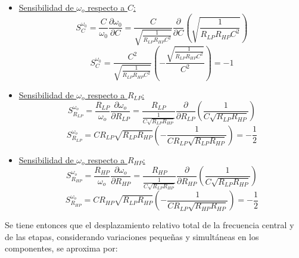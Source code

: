 \documentclass[12pt,a4paper]{article}
\begin{document}
\begin{itemize}
    \item \underline{Sensibilidad de $\omega_o$ respecto a $C$:}
    \begin{equation}
        \label{eq_64}
        S_{C}^{\omega_{0}} = \frac{C}{\omega_{0}}\frac{\partial \omega_{0}}{\partial C} = \frac{C}{\sqrt{\frac{1}{R_{LP}R_{HP}C^2}}}\frac{\partial}{\partial C}\left(\sqrt{\frac{1}{R_{LP}R_{HP}C^2}}\right)
    \end{equation}
    \begin{equation}
        \label{eq_65}
        S_{C}^{\omega_{0}} = \frac{C^{2}}{\sqrt{\frac{1}{R_{LP}R_{HP}C^2}}} \left(-\frac{\sqrt{\frac{1}{R_{LP}R_{HP}C^2}}}{C^2}\right) = - 1
    \end{equation}
    \item \underline{Sensibilidad de $\omega_o$ respecto a $R_{LP}$:}
    \begin{equation}
        \label{eq_66}
            S_{R_{LP}}^{\omega_o} = \frac{R_{LP}}{\omega_{o}} \frac{\partial \omega_{o}}{\partial R_{LP}} = \frac{R_{LP}}{\frac{1}{C\sqrt{R_{LP}R_{HP}}}} \frac{\partial}{\partial R_{LP}} \left(\frac{1}{C\sqrt{R_{LP}R_{HP}}}\right) 
        \end{equation}
        \begin{equation}
            \label{eq_67}
            S_{R_{LP}}^{\omega_o} =  CR_{LP}\sqrt{R_{LP}R_{HP}} \left(-\frac{1}{CR_{LP}\sqrt{R_{LP}R_{HP}}}\right) = - \frac{1}{2} 
        \end{equation}
    \item \underline{Sensibilidad de $\omega_o$ respecto a $R_{HP}$:}
    \begin{equation}
        \label{eq_68}
            S_{R_{HP}}^{\omega_o} = \frac{R_{HP}}{\omega_{o}} \frac{\partial \omega_{o}}{\partial R_{HP}} = \frac{R_{HP}}{\frac{1}{C\sqrt{R_{LP}R_{HP}}}} \frac{\partial}{\partial R_{HP}} \left(\frac{1}{C\sqrt{R_{LP}R_{HP}}}\right) 
        \end{equation}
        \begin{equation}
            \label{eq_69}
            S_{R_{HP}}^{\omega_o} =  CR_{HP}\sqrt{R_{LP}R_{HP}} \left(-\frac{1}{CR_{LP}\sqrt{R_{HP}R_{HP}}}\right) = - \frac{1}{2} 
        \end{equation}
\end{itemize}

Se tiene entonces que el desplazamiento relativo total de la frecuencia central y de las etapas, considerando variaciones pequeñas y simultáneas en los componentes, se aproxima por:
\end{document}
